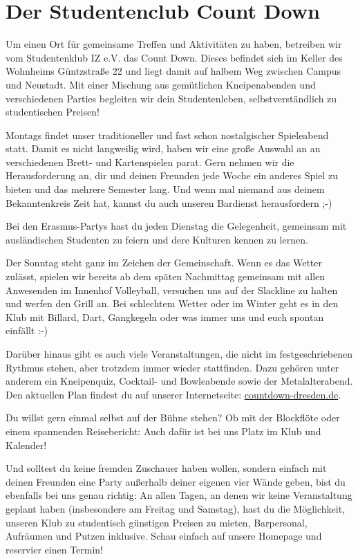 \chapter{Der Studentenclub Count Down}


Um einen Ort für gemeinsame Treffen und Aktivitäten zu haben, betreiben wir vom Studentenklub IZ e.V. das Count Down.
Dieses befindet sich im Keller des Wohnheims Güntzstraße 22 und liegt damit auf halbem Weg zwischen Campus und Neustadt.
Mit einer Mischung aus gemütlichen Kneipenabenden und verschiedenen Parties begleiten wir dein Studentenleben, selbstverständlich zu studentischen Preisen!

Montags findet unser traditioneller und fast schon nostalgischer Spieleabend statt.
Damit es nicht langweilig wird, haben wir eine große Auswahl an an verschiedenen Brett- und Kartenspielen parat.
Gern nehmen wir die Herausforderung an, dir und deinen Freunden jede Woche ein anderes Spiel zu bieten und das mehrere Semester lang.
Und wenn mal niemand aus deinem Bekanntenkreis Zeit hat, kannst du auch unseren Bardienst herausfordern ;-)

Bei den Erasmus-Partys hast du jeden Dienstag die Gelegenheit, gemeinsam mit ausländischen Studenten zu feiern und dere Kulturen kennen zu lernen.

Der Sonntag steht ganz im Zeichen der Gemeinschaft.
Wenn es das Wetter zulässt, spielen wir bereits ab dem späten Nachmittag gemeinsam mit allen Anwesenden im Innenhof Volleyball, versuchen uns auf der Slackline zu halten und werfen den Grill an.
Bei schlechtem Wetter oder im Winter geht es in den Klub mit Billard, Dart, Gangkegeln oder was immer uns und euch spontan einfällt :-)

Darüber hinaus gibt es auch viele Veranstaltungen, die nicht im festgeschriebenen Rythmus stehen, aber trotzdem immer wieder stattfinden.
Dazu gehören unter anderem ein Kneipenquiz, Cocktail- und Bowleabende sowie der Metalalterabend.
Den aktuellen Plan findest du auf unserer Internetseite: \url{countdown-dresden.de}.

Du willst gern einmal selbst auf der Bühne stehen?
Ob mit der Blockflöte oder einem spannenden Reisebericht:
Auch dafür ist bei uns Platz im Klub und Kalender!

Und solltest du keine fremden Zuschauer haben wollen, sondern einfach mit deinen Freunden eine Party außerhalb deiner eigenen vier Wände geben, bist du ebenfalls bei uns genau richtig:
An allen Tagen, an denen wir keine Veranstaltung geplant haben (insbesondere am Freitag und Samstag), hast du die Möglichkeit, unseren Klub zu studentisch günstigen Preisen zu mieten, Barpersonal, Aufräumen und Putzen inklusive.
Schau einfach auf unsere Homepage und reservier einen Termin!

